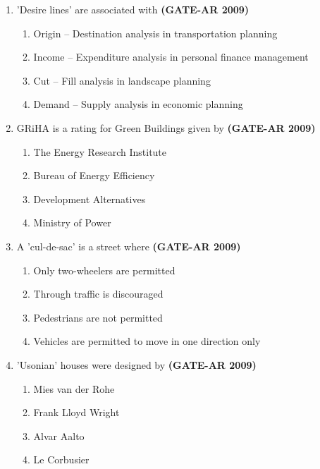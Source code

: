 \documentclass[a4paper,10pt]{article}
\begin{document}
\begin{enumerate}
    \item 'Desire lines' are associated with \hfill \textbf{(GATE-AR 2009)}
    \begin{enumerate}
        \item Origin – Destination analysis in transportation planning
        \item Income – Expenditure analysis in personal finance management
        \item Cut – Fill analysis in landscape planning
        \item Demand – Supply analysis in economic planning
    \end{enumerate}

	\item GRiHA is a rating for Green Buildings given by \hfill \textbf{(GATE-AR 2009)}
    \begin{multicols}{2}
	\begin{enumerate}
        \item The Energy Research Institute
        \item Bureau of Energy Efficiency
        \item Development Alternatives
        \item Ministry of Power
    \end{enumerate}
	\end{multicols}
    
    \item A 'cul-de-sac' is a street where \hfill \textbf{(GATE-AR 2009)}
    \begin{enumerate}
        \item Only two-wheelers are permitted
        \item Through traffic is discouraged
        \item Pedestrians are not permitted
        \item Vehicles are permitted to move in one direction only
    \end{enumerate}

    \item 'Usonian' houses were designed by \hfill \textbf{(GATE-AR 2009)}
    \begin{multicols}{2}
	\begin{enumerate}
        \item Mies van der Rohe
        \item Frank Lloyd Wright
        \item Alvar Aalto
        \item Le Corbusier
    \end{enumerate}
	\end{multicols}
    

\end{enumerate}
\end{document}
